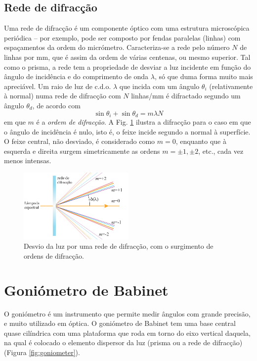 \documentclass[a4paper,twoside,11pt]{report}      %
\begin{document}
\subsection{\sf Rede de difracção}
Uma rede de difracção é um componente óptico com uma estrutura microscópica periódica – por exemplo, pode ser composto por fendas paralelas (linhas) com espaçamentos da ordem do micrómetro. Caracteriza-se a rede pelo número $N$ de linhas por mm, que é assim da ordem de várias centenas, ou mesmo superior. Tal como o prisma, a rede tem a propriedade de desviar a luz incidente em função do ângulo de incidência e do comprimento de onda $\lambda$, só que duma forma muito mais apreciável. Um raio de luz de c.d.o. $\lambda$ que incida com um ângulo $\theta_i$ (relativamente à normal) numa rede de difracção com $N$ linhas/mm é difractado segundo um ângulo $\theta_d$, de acordo com
\begin{equation}
\sin \theta_i+\sin\theta_d=m \lambda N
\end{equation}
em que $m$ é a \emph{ordem de difracção}. A Fig. \ref{fig:rede1} ilustra a difracção para o caso em que o ângulo de incidência é nulo, isto é, o feixe incide segundo a normal à superfície. O feixe central, não desviado, é considerado como $m=0$, enquanto que à esquerda e direita surgem simetricamente as ordens $m=\pm 1, \pm 2$, etc., cada vez menos intensas.

\begin{figure}[!t]  
\centering 
	\includegraphics[width=0.5\textwidth]{rede1}
	\caption{Desvio da luz por uma rede de difracção, com o surgimento de ordens de difracção. \label{fig:rede1}} 
\end{figure}


\section{\sf Goniómetro de Babinet}
O goniómetro é um instrumento que permite medir ângulos com grande precisão, e muito utilizado em óptica. O goniómetro de Babinet tem uma base central quase cilíndrica com uma plataforma que roda em torno do eixo vertical daquela, na qual é colocado o elemento dispersor da luz (prisma ou a rede de difracção) (Figura \ref{fig:goniometer}). 
\end{document}
